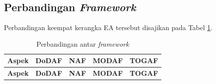 \subsection{Perbandingan \textit{Framework}}
Perbandingan keempat kerangka EA tersebut disajikan pada Tabel \ref{tab:perbandingan-framework}.

{\footnotesize
\begin{longtable}{|p{2.1cm}|p{2.5cm}|p{2.5cm}|p{2.5cm}|p{2.5cm}|}
\caption{Perbandingan antar \textit{framework}} \label{tab:perbandingan-framework} \\
\hline
\textbf{Aspek} & \textbf{DoDAF} & \textbf{NAF} & \textbf{MODAF} & \textbf{TOGAF} \\
\hline
\endfirsthead

\hline
\textbf{Aspek} & \textbf{DoDAF} & \textbf{NAF} & \textbf{MODAF} & \textbf{TOGAF} \\
\hline
\endhead


\end{longtable}}
